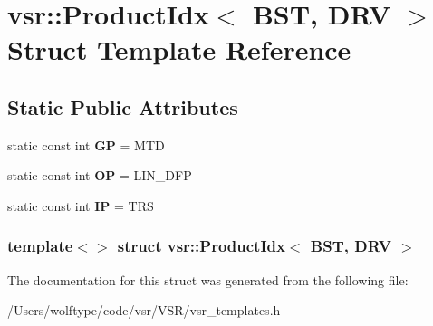 \hypertarget{structvsr_1_1_product_idx_3_01_b_s_t_00_01_d_r_v_01_4}{\section{vsr\-:\-:Product\-Idx$<$ B\-S\-T, D\-R\-V $>$ Struct Template Reference}
\label{structvsr_1_1_product_idx_3_01_b_s_t_00_01_d_r_v_01_4}
}
\subsection*{Static Public Attributes}
\begin{DoxyCompactItemize}
\item 
\hypertarget{structvsr_1_1_product_idx_3_01_b_s_t_00_01_d_r_v_01_4_a74b62fd0338b741d8389a69ae50bb920}{static const int {\bfseries G\-P} = M\-T\-D}\label{structvsr_1_1_product_idx_3_01_b_s_t_00_01_d_r_v_01_4_a74b62fd0338b741d8389a69ae50bb920}

\item 
\hypertarget{structvsr_1_1_product_idx_3_01_b_s_t_00_01_d_r_v_01_4_a3b54ddaa30a181c1ff917f85b5c3b3fd}{static const int {\bfseries O\-P} = L\-I\-N\-\_\-\-D\-F\-P}\label{structvsr_1_1_product_idx_3_01_b_s_t_00_01_d_r_v_01_4_a3b54ddaa30a181c1ff917f85b5c3b3fd}

\item 
\hypertarget{structvsr_1_1_product_idx_3_01_b_s_t_00_01_d_r_v_01_4_a08da63e9bebca66c52e9d94a7f6b74de}{static const int {\bfseries I\-P} = T\-R\-S}\label{structvsr_1_1_product_idx_3_01_b_s_t_00_01_d_r_v_01_4_a08da63e9bebca66c52e9d94a7f6b74de}

\end{DoxyCompactItemize}
\subsubsection*{template$<$$>$ struct vsr\-::\-Product\-Idx$<$ B\-S\-T, D\-R\-V $>$}



The documentation for this struct was generated from the following file\-:\begin{DoxyCompactItemize}
\item 
/\-Users/wolftype/code/vsr/\-V\-S\-R/vsr\-\_\-templates.\-h\end{DoxyCompactItemize}

